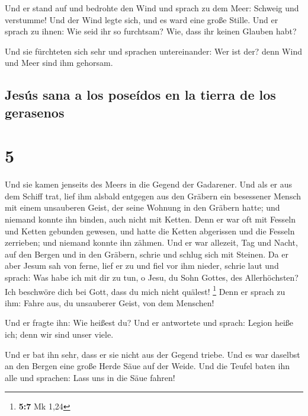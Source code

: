  Und er stand auf und bedrohte den Wind und sprach zu dem
Meer: Schweig und verstumme! Und der Wind legte sich, und es ward eine
große Stille.  Und er sprach zu ihnen: Wie seid ihr so
furchtsam? Wie, dass ihr keinen Glauben habt?

 Und sie fürchteten sich sehr und sprachen untereinander:
Wer ist der? denn Wind und Meer sind ihm gehorsam.

\hypertarget{jesuxfas-sana-a-los-poseuxeddos-en-la-tierra-de-los-gerasenos}{%
\subsection{Jesús sana a los poseídos en la tierra de los
gerasenos}\label{jesuxfas-sana-a-los-poseuxeddos-en-la-tierra-de-los-gerasenos}}

\hypertarget{section-4}{%
\section{5}\label{section-4}}

 Und sie kamen jenseits des Meers in die Gegend der
Gadarener.  Und als er aus dem Schiff trat, lief ihm
alsbald entgegen aus den Gräbern ein besessener Mensch mit einem
unsauberen Geist,  der seine Wohnung in den Gräbern hatte;
und niemand konnte ihn binden, auch nicht mit Ketten. 
Denn er war oft mit Fesseln und Ketten gebunden gewesen, und hatte die
Ketten abgerissen und die Fesseln zerrieben; und niemand konnte ihn
zähmen.  Und er war allezeit, Tag und Nacht, auf den
Bergen und in den Gräbern, schrie und schlug sich mit Steinen.
 Da er aber Jesum sah von ferne, lief er zu und fiel vor
ihm nieder, schrie laut und sprach:  Was habe ich mit dir
zu tun, o Jesu, du Sohn Gottes, des Allerhöchsten? Ich beschwöre dich
bei Gott, dass du mich nicht quälest! \footnote{\textbf{5:7} Mk 1,24}
 Denn er sprach zu ihm: Fahre aus, du unsauberer Geist,
von dem Menschen!

 Und er fragte ihn: Wie heißest du? Und er antwortete und
sprach: Legion heiße ich; denn wir sind unser viele.

 Und er bat ihn sehr, dass er sie nicht aus der Gegend
triebe.  Und es war daselbst an den Bergen eine große
Herde Säue auf der Weide.  Und die Teufel baten ihn alle
und sprachen: Lass uns in die Säue fahren!

